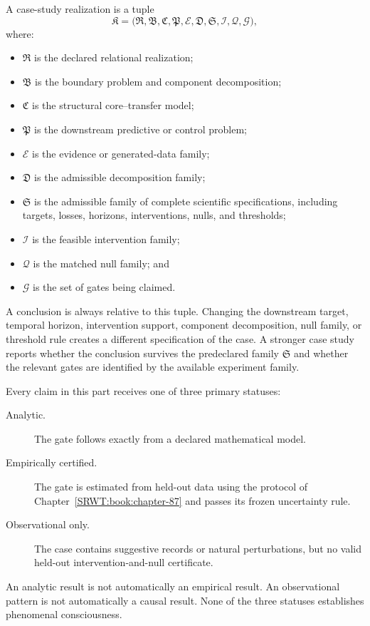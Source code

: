 \begin{SRWTdefinition}\label{SRWT:def:case-study-realization}
A case-study realization is a tuple
\[
\mathfrak K
=
\bigl(
\mathfrak R,
\mathfrak B,
\mathfrak C,
\mathfrak P,
\mathcal E,
\mathfrak D,
\mathfrak S,
\mathcal I,
\mathcal Q,
\mathcal G
\bigr),
\]
where:
\begin{itemize}
\item \(\mathfrak R\) is the declared relational realization;
\item \(\mathfrak B\) is the boundary problem and component decomposition;
\item \(\mathfrak C\) is the structural core--transfer model;
\item \(\mathfrak P\) is the downstream predictive or control problem;
\item \(\mathcal E\) is the evidence or generated-data family;
\item \(\mathfrak D\) is the admissible decomposition family;
\item \(\mathfrak S\) is the admissible family of complete scientific
 specifications, including targets, losses, horizons, interventions, nulls,
 and thresholds;
\item \(\mathcal I\) is the feasible intervention family;
\item \(\mathcal Q\) is the matched null family; and
\item \(\mathcal G\) is the set of gates being claimed.
\end{itemize}
A conclusion is always relative to this tuple. Changing the downstream target,
temporal horizon, intervention support, component decomposition, null family,
or threshold rule creates a different specification of the case. A stronger
case study reports whether the conclusion survives the predeclared family
\(\mathfrak S\) and whether the relevant gates are identified by the available
experiment family.
\end{SRWTdefinition}


Every claim in this part receives one of three primary statuses:
\begin{description}
\item[Analytic.] The gate follows exactly from a declared mathematical model.
\item[Empirically certified.] The gate is estimated from held-out data using
 the protocol of Chapter~\ref{SRWT:book:chapter-87} and passes its frozen uncertainty rule.
\item[Observational only.] The case contains suggestive records or natural
 perturbations, but no valid held-out intervention-and-null certificate.
\end{description}
An analytic result is not automatically an empirical result. An observational
pattern is not automatically a causal result. None of the three statuses
establishes phenomenal consciousness.

